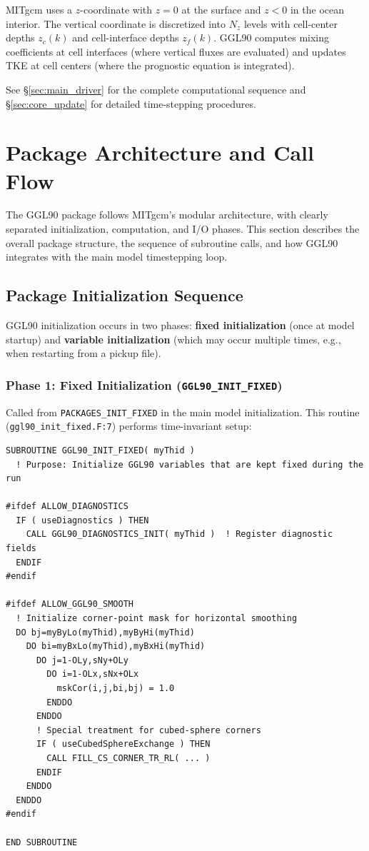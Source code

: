 \documentclass[12pt,letterpaper]{article}
\begin{document}
MITgcm uses a $z$-coordinate with $z=0$ at the surface and $z<0$ in the ocean interior. The vertical coordinate is discretized into $N_z$ levels with cell-center depths $z_c(k)$ and cell-interface depths $z_f(k)$. GGL90 computes mixing coefficients at cell interfaces (where vertical fluxes are evaluated) and updates TKE at cell centers (where the prognostic equation is integrated).

See \S\ref{sec:main_driver} for the complete computational sequence and \S\ref{sec:core_update} for detailed time-stepping procedures.

\section{Package Architecture and Call Flow}

The GGL90 package follows MITgcm's modular architecture, with clearly separated
initialization, computation, and I/O phases. This section describes the overall
package structure, the sequence of subroutine calls, and how GGL90 integrates
with the main model timestepping loop.

\subsection{Package Initialization Sequence}

GGL90 initialization occurs in two phases: \textbf{fixed initialization} (once
at model startup) and \textbf{variable initialization} (which may occur multiple
times, e.g., when restarting from a pickup file).

\subsubsection{Phase 1: Fixed Initialization (\texttt{GGL90\_INIT\_FIXED})}

Called from \texttt{PACKAGES\_INIT\_FIXED} in the main model initialization.
This routine (\texttt{ggl90\_init\_fixed.F:7}) performs time-invariant setup:

\begin{lstlisting}[caption={\texttt{ggl90\_init\_fixed.F}, lines 7--44 -- Fixed initialization.}]
SUBROUTINE GGL90_INIT_FIXED( myThid )
  ! Purpose: Initialize GGL90 variables that are kept fixed during the run

#ifdef ALLOW_DIAGNOSTICS
  IF ( useDiagnostics ) THEN
    CALL GGL90_DIAGNOSTICS_INIT( myThid )  ! Register diagnostic fields
  ENDIF
#endif

#ifdef ALLOW_GGL90_SMOOTH
  ! Initialize corner-point mask for horizontal smoothing
  DO bj=myByLo(myThid),myByHi(myThid)
    DO bi=myBxLo(myThid),myBxHi(myThid)
      DO j=1-OLy,sNy+OLy
        DO i=1-OLx,sNx+OLx
          mskCor(i,j,bi,bj) = 1.0
        ENDDO
      ENDDO
      ! Special treatment for cubed-sphere corners
      IF ( useCubedSphereExchange ) THEN
        CALL FILL_CS_CORNER_TR_RL( ... )
      ENDIF
    ENDDO
  ENDDO
#endif

END SUBROUTINE
\end{lstlisting}
\end{document}
